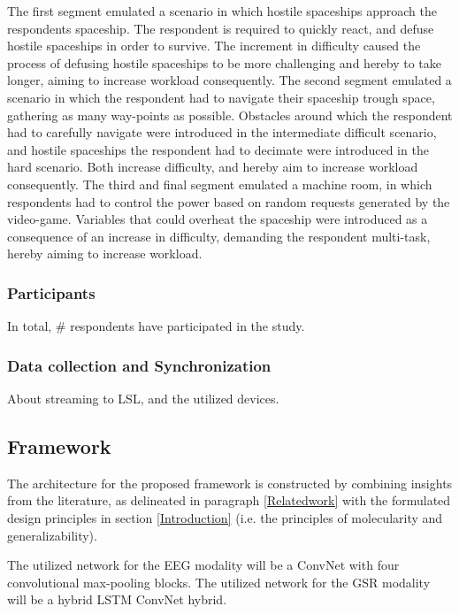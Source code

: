 \documentclass{article}
\begin{document}
The first segment emulated a scenario in which hostile spaceships approach the respondents spaceship. The respondent is required to  quickly react, and defuse hostile spaceships in order to survive. The increment in difficulty caused the process of defusing hostile spaceships to be more challenging and hereby to take longer,  aiming to increase workload consequently. The second segment emulated a scenario in which the respondent had to navigate their spaceship trough space, gathering as many way-points as possible. Obstacles around which the respondent had to carefully navigate were introduced in the intermediate difficult scenario, and hostile spaceships the respondent had to decimate were introduced in the hard scenario. Both increase difficulty, and hereby aim to increase workload consequently. The third and final segment emulated a machine room, in which respondents had to control the power based on random requests generated by the video-game. Variables that could overheat the spaceship  were introduced as a consequence of an increase in difficulty, demanding the respondent multi-task, hereby aiming to increase workload. 

\subsubsection{Participants}
In total, \# respondents have participated in the study. 

\subsubsection{Data collection and Synchronization}
About streaming to LSL, and the utilized devices. 

\subsection{Framework}
The architecture for the proposed framework is constructed by combining insights from the literature, as delineated in paragraph \ref{Relatedwork} with the formulated design principles in section \ref{Introduction} (i.e. the principles of molecularity and generalizability). 

The utilized network for the EEG modality will be a ConvNet with four convolutional max-pooling blocks. The utilized network for the GSR modality will be a hybrid LSTM ConvNet hybrid.  
\end{document}
